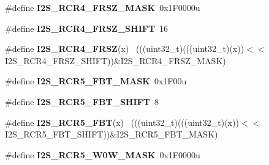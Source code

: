 \begin{DoxyCompactItemize}
\item 
\hypertarget{group___i2_s___register___masks_ga8eda652c5a5ee719963f7103561bdc73}{}\#define {\bfseries I2\+S\+\_\+\+R\+C\+R4\+\_\+\+F\+R\+S\+Z\+\_\+\+M\+A\+S\+K}~0x1\+F0000u\label{group___i2_s___register___masks_ga8eda652c5a5ee719963f7103561bdc73}

\item 
\hypertarget{group___i2_s___register___masks_gaae89e490a3b7562ea1a9a2992a6a97a7}{}\#define {\bfseries I2\+S\+\_\+\+R\+C\+R4\+\_\+\+F\+R\+S\+Z\+\_\+\+S\+H\+I\+F\+T}~16\label{group___i2_s___register___masks_gaae89e490a3b7562ea1a9a2992a6a97a7}

\item 
\hypertarget{group___i2_s___register___masks_ga7a99bde0c58a42d3efabc8a1feba3725}{}\#define {\bfseries I2\+S\+\_\+\+R\+C\+R4\+\_\+\+F\+R\+S\+Z}(x)                                              ~(((uint32\+\_\+t)(((uint32\+\_\+t)(x))$<$$<$I2\+S\+\_\+\+R\+C\+R4\+\_\+\+F\+R\+S\+Z\+\_\+\+S\+H\+I\+F\+T))\&I2\+S\+\_\+\+R\+C\+R4\+\_\+\+F\+R\+S\+Z\+\_\+\+M\+A\+S\+K)\label{group___i2_s___register___masks_ga7a99bde0c58a42d3efabc8a1feba3725}

\item 
\hypertarget{group___i2_s___register___masks_ga54847f1139b421f0f0df7af775a11996}{}\#define {\bfseries I2\+S\+\_\+\+R\+C\+R5\+\_\+\+F\+B\+T\+\_\+\+M\+A\+S\+K}~0x1\+F00u\label{group___i2_s___register___masks_ga54847f1139b421f0f0df7af775a11996}

\item 
\hypertarget{group___i2_s___register___masks_gabe8f4784a8f4ce3235e31483d0b6e5f4}{}\#define {\bfseries I2\+S\+\_\+\+R\+C\+R5\+\_\+\+F\+B\+T\+\_\+\+S\+H\+I\+F\+T}~8\label{group___i2_s___register___masks_gabe8f4784a8f4ce3235e31483d0b6e5f4}

\item 
\hypertarget{group___i2_s___register___masks_gaa69c444a625365478b4193b077baa686}{}\#define {\bfseries I2\+S\+\_\+\+R\+C\+R5\+\_\+\+F\+B\+T}(x)                                                ~(((uint32\+\_\+t)(((uint32\+\_\+t)(x))$<$$<$I2\+S\+\_\+\+R\+C\+R5\+\_\+\+F\+B\+T\+\_\+\+S\+H\+I\+F\+T))\&I2\+S\+\_\+\+R\+C\+R5\+\_\+\+F\+B\+T\+\_\+\+M\+A\+S\+K)\label{group___i2_s___register___masks_gaa69c444a625365478b4193b077baa686}

\item 
\hypertarget{group___i2_s___register___masks_ga21ac7b9671ee42b3ff23e61fbc762bd6}{}\#define {\bfseries I2\+S\+\_\+\+R\+C\+R5\+\_\+\+W0\+W\+\_\+\+M\+A\+S\+K}~0x1\+F0000u\label{group___i2_s___register___masks_ga21ac7b9671ee42b3ff23e61fbc762bd6}


\end{DoxyCompactItemize}
